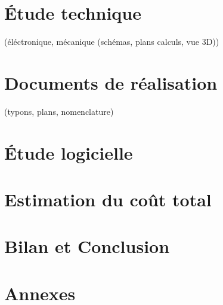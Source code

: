 \documentclass[a4paper, 12pt, french]{article}
\begin{document}
\pagebreak
\section{Étude technique} %
\label{sec:_tude_technique}
	(éléctronique, mécanique (schémas, plans calculs, vue 3D))




\pagebreak
\section{Documents de réalisation} %
\label{sec:documents_de_r_alisation}
(typons, plans, nomenclature)




\pagebreak
\section{Étude logicielle} %
\label{sec:_tude_logicielle}




\pagebreak
\section{Estimation du coût total} %
\label{sec:estimation_du_co_t_total}




\pagebreak
\section*{Bilan et Conclusion} %
\label{sec:bilan_et_conclusion}



\pagebreak
\section*{Annexes} %
\label{sec:annexxes}

\end{document}

